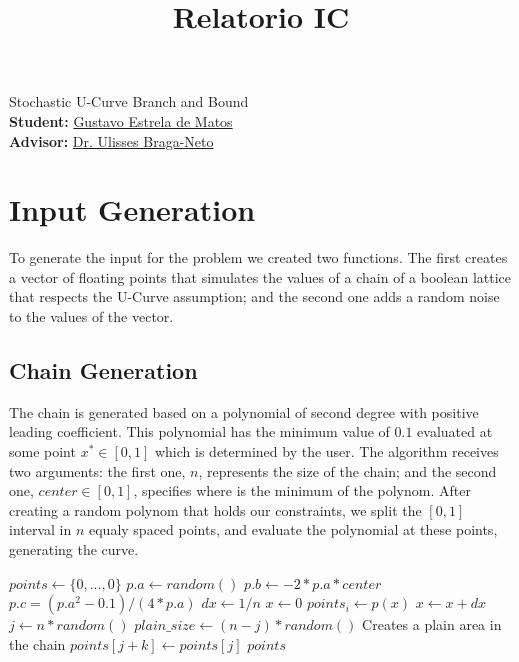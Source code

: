 \documentclass[12pt]{article}
\title{Relatorio IC}
\begin{document}
\begin{center}
{\Large Stochastic U-Curve Branch and Bound \\}
\bigskip
{\bf Student:} \href{mailto:estrela.gustavo.matos@gmail.com}{Gustavo Estrela de Matos} \\
        {\bf Advisor:} \href{mailto:ulisses@ece.tamu.edu}{Dr. Ulisses Braga-Neto}
\end{center}

\section{Input Generation}
To generate the input for the problem we created two functions. The first creates a vector of floating points that simulates the values of a chain of a boolean lattice that respects the U-Curve assumption; and the second one adds a random noise to the values of the vector.

\subsection{Chain Generation}
The chain is generated based on a polynomial of second degree with positive leading coefficient. This polynomial has the minimum value of $0.1$ evaluated at some point $x^* \in [0, 1]$ which is determined by the user. The algorithm receives two arguments: the first one, $n$, represents the size of the chain; and the second one, $center \in [0, 1]$, specifies where is the minimum of the polynom. After creating a random polynom that holds our constraints, we split the $[0,1]$ interval in $n$ equaly spaced points, and evaluate the polynomial at these points, generating the curve.

\begin{algorithm}[t]
\caption{U-Curve Input Creator}
\begin{algorithmic}[1]
    \State $points \gets \{0, ..., 0\}$
    \State $p.a \gets random ()$
    \State $p.b \gets -2 * p.a * center$
    \State $p.c = (p.a^2 - 0.1) / (4 * p.a)$
    \State $dx \gets 1 / n$
    \State $x \gets 0$
        \State $points_i \gets p (x)$
        \State $x \gets x + dx$
    \EndFor
    \State $j \gets n * random ()$
    \State $plain\_size \gets (n - j) * random ()$
     \Comment Creates a plain area in the chain
        \State $points[j + k] \gets points[j]$
    \EndFor
    \State
    \Return $points$
\EndProcedure
\end{algorithmic}
\end{algorithm}
\end{document}
